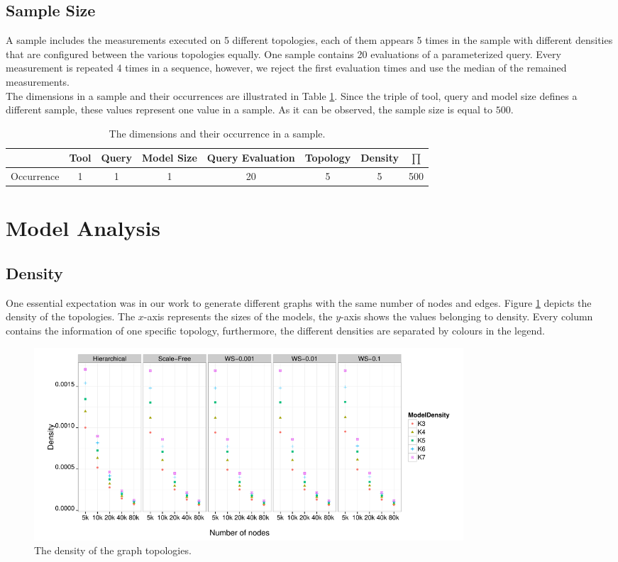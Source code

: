 \subsection{Sample Size}
A sample includes the measurements executed on 5 different topologies, each of them appears 5 times in the sample with different densities that are configured between the various topologies equally. One sample contains 20 evaluations of a parameterized query. Every measurement is repeated 4 times in a sequence, however, we reject the first evaluation times and use the median of the remained measurements.\\
The dimensions in a sample and their occurrences are illustrated in Table \ref{tab:sample_size}. Since the triple of tool, query and model size defines a different sample, these values represent one value in a sample. As it can be observed, the sample size is equal to $500$.

\begin{table}[ht]
	\footnotesize
	\centering
	
	\begin{tabular}{ l c c c c c c || c }
		\toprule
		 & Tool & Query & Model Size & Query Evaluation & Topology  & Density & $\prod$\\ [5pt] \hline
		Occurrence & 1 & 1 & 1 & 20 & 5 & 5 & 500 \\ \hline
		\bottomrule
	\end{tabular}
	\caption{The dimensions and their occurrence in a sample.}
	\label{tab:sample_size}
\end{table}


\section{Model Analysis}

\subsection{Density}
One essential expectation was in our work to generate different graphs with the same number of nodes and edges. Figure \ref{fig:density} depicts the density of the topologies. The $x$-axis represents the sizes of the models, the $y$-axis shows the values belonging to density. Every column contains the information of one specific topology, furthermore, the different densities are separated by colours in the legend.
\begin{figure}[!ht]
	\centering
	\includegraphics[width=160mm, keepaspectratio]{figures/density.pdf}
	\caption{The density of the graph topologies.}
	\label{fig:density}
\end{figure}

